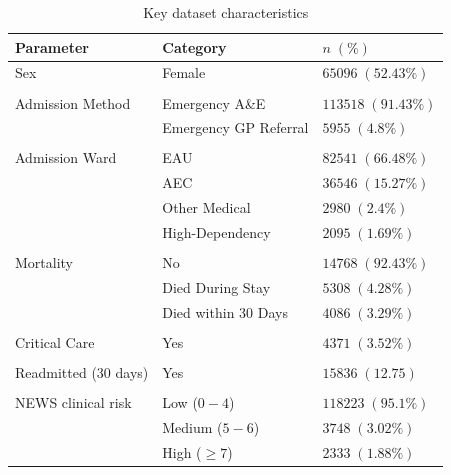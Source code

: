 \documentclass[10pt,journal, compsoc]{IEEEtran}
\begin{document}
\begin{table}[tbp]
    \renewcommand{\arraystretch}{1.2}
    \centering
    \caption{Key dataset characteristics}
    \label{tab:population}
    \begin{tabular}{l l l}
        \toprule
        Parameter            & Category              & $n\;(\%)$           \\
        \midrule
        Sex                  & Female                & $65096\;(52.43\%)$  \\\\
        Admission Method     & Emergency A\&E        & $113518\;(91.43\%)$ \\
                             & Emergency GP Referral & $5955\;(4.8\%)$     \\\\
        Admission Ward       & EAU                   & $82541\;(66.48\%)$  \\
                             & AEC                   & $36546\;(15.27\%)$  \\
                             & Other Medical         & $2980\;(2.4\%)$     \\
                             & High-Dependency       & $2095\;(1.69\%)$    \\\\
        Mortality            & No                    & $14768\;(92.43\%)$  \\
                             & Died During Stay      & $5308\;(4.28\%)$    \\
                             & Died within 30 Days   & $4086\;(3.29\%)$    \\\\
        Critical Care        & Yes                   & $4371\;(3.52\%)$    \\\\
        Readmitted (30 days) & Yes                   & $15836\;(12.75)$    \\\\
        NEWS clinical risk   & Low ($0-4$)           & $118223\;(95.1\%)$  \\
                             & Medium ($5-6$)        & $3748\;(3.02\%)$    \\
                             & High ($\geq 7$)       & $2333\;(1.88\%)$    \\
        \bottomrule
    \end{tabular}
\end{table}
\end{document}
